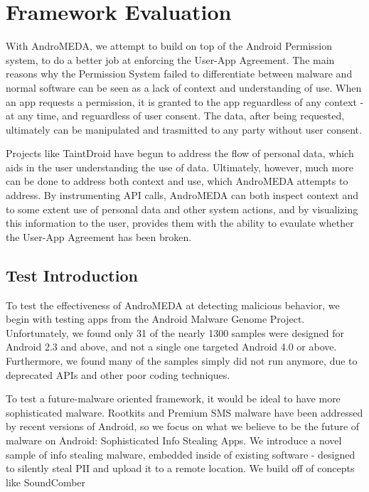 \chapter{Framework Evaluation}
\label{sec:framework}

With AndroMEDA, we attempt to build on top of the Android Permission system, to do a better job at enforcing the User-App Agreement. The main reasons why the Permission System failed to differentiate between malware and normal software can be seen as a lack of context and understanding of use. When an app requests a permission, it is granted to the app reguardless of any context - at any time, and reguardless of user consent. The data, after being requested, ultimately can be manipulated and trasmitted to any party without user consent. 

Projects like TaintDroid\citep{enck2010taintdroid} have begun to address the flow of personal data, which aids in the user understanding the use of data. Ultimately, however, much more can be done to address both context and use, which AndroMEDA attempts to address. By instrumenting API calls, AndroMEDA can both inspect context and to some extent use of personal data and other system actions, and by visualizing this information to the user, provides them with the ability to evaulate whether the User-App Agreement has been broken.

\section{Test Introduction}
To test the effectiveness of AndroMEDA at detecting malicious behavior, we begin with testing apps from the Android Malware Genome Project\citep{zhou2012dissecting}. Unfortunately, we found only 31 of the nearly 1300 samples were designed for Android 2.3 and above, and not a single one targeted Android 4.0 or above. Furthermore, we found many of the samples simply did not run anymore, due to deprecated APIs and other poor coding techniques. 

To test a future-malware oriented framework, it would be ideal to have more sophisticated malware. Rootkits and Premium SMS malware have been addressed by recent versions of Android, so we focus on what we believe to be the future of malware on Android: Sophisticated Info Stealing Apps. We introduce a novel sample of info stealing malware, embedded inside of existing software - designed to silently steal PII and upload it to a remote location. We build off of concepts like SoundComber\citep{schlegel2011soundcomber}